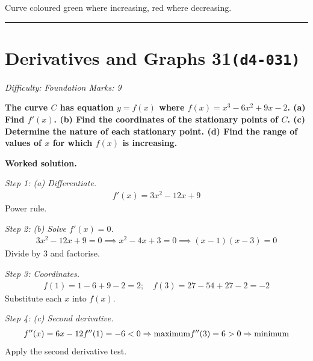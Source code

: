 \documentclass[11pt]{article}
\newcommand{\question}[1]{\par\medskip\noindent\textbf{#1}\par}
\begin{document}
\begin{center}
{
}
\end{center}
\small Curve coloured green where increasing, red where decreasing.\normalsize

\medskip\hrule

\section*{Derivatives and Graphs 31\quad\small\texttt{(d4-031)}}
\textit{Difficulty: Foundation \quad\textbar\quad Marks: 9}

\question{The curve \( C \) has equation \( y = f(x) \) where \( f(x) = x^3 - 6x^2 + 9x - 2 \). (a) Find \( f'(x) \). (b) Find the coordinates of the stationary points of \( C \). (c) Determine the nature of each stationary point. (d) Find the range of values of \( x \) for which \( f(x) \) is increasing.}

\textbf{Worked solution.}

\textit{Step 1: (a) Differentiate.}
\[\begin{gathered}
f'(x) = 3x^2 - 12x + 9
\end{gathered}\]
Power rule.

\textit{Step 2: (b) Solve \( f'(x) = 0 \).}
\[\begin{gathered}
3x^2 - 12x + 9 = 0 \implies x^2 - 4x + 3 = 0 \implies (x-1)(x-3) = 0
\end{gathered}\]
Divide by 3 and factorise.

\textit{Step 3: Coordinates.}
\[\begin{gathered}
f(1) = 1 - 6 + 9 - 2 = 2; \quad f(3) = 27 - 54 + 27 - 2 = -2
\end{gathered}\]
Substitute each \( x \) into \( f(x) \).

\textit{Step 4: (c) Second derivative.}
\[\begin{gathered}
f''(x) = 6x - 12 \newline f''(1) = -6 < 0 \Rightarrow \text{maximum} \newline f''(3) = 6 > 0 \Rightarrow \text{minimum}
\end{gathered}\]
Apply the second derivative test.
\end{document}
